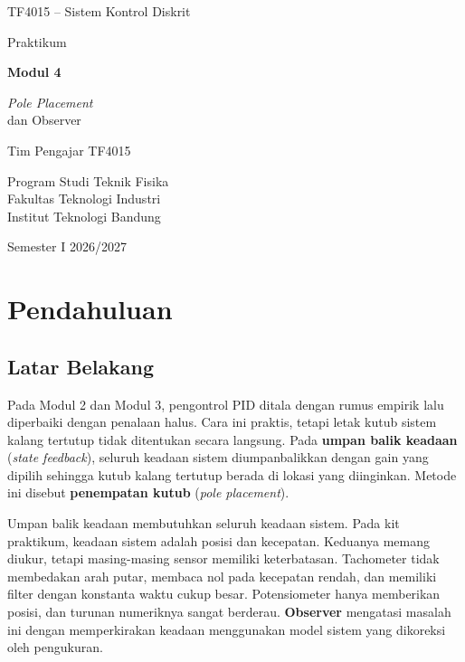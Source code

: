 \documentclass[11pt,a4paper]{article}
\begin{document}
\begin{titlepage}
\centering
\vspace*{2cm}
{\large TF4015 -- Sistem Kontrol Diskrit\par}
\vspace{2.5cm}
{\Large Praktikum\par}
\vspace{0.4cm}
{\huge\bfseries Modul 4\par}
\vspace{0.4cm}
{\LARGE \textit{Pole Placement}\\dan Observer\par}
\vfill
{\large Tim Pengajar TF4015\par}
\vspace{0.3cm}
{\large Program Studi Teknik Fisika\\Fakultas Teknologi Industri\\Institut Teknologi Bandung\par}
\vspace{0.8cm}
{\large Semester I 2026/2027\par}
\end{titlepage}

\tableofcontents
\newpage
{}
\setcounter{page}{1}

\section{Pendahuluan}
\subsection{Latar Belakang}
Pada Modul 2 dan Modul 3, pengontrol PID ditala dengan rumus empirik lalu diperbaiki dengan penalaan halus. Cara ini praktis, tetapi letak kutub sistem kalang tertutup tidak ditentukan secara langsung. Pada \textbf{umpan balik keadaan} (\textit{state feedback}), seluruh keadaan sistem diumpanbalikkan dengan gain yang dipilih sehingga kutub kalang tertutup berada di lokasi yang diinginkan. Metode ini disebut \textbf{penempatan kutub} (\textit{pole placement}).

Umpan balik keadaan membutuhkan seluruh keadaan sistem. Pada kit praktikum, keadaan sistem adalah posisi dan kecepatan. Keduanya memang diukur, tetapi masing-masing sensor memiliki keterbatasan. Tachometer tidak membedakan arah putar, membaca nol pada kecepatan rendah, dan memiliki filter dengan konstanta waktu cukup besar. Potensiometer hanya memberikan posisi, dan turunan numeriknya sangat berderau. \textbf{Observer} mengatasi masalah ini dengan memperkirakan keadaan menggunakan model sistem yang dikoreksi oleh pengukuran.
\end{document}
